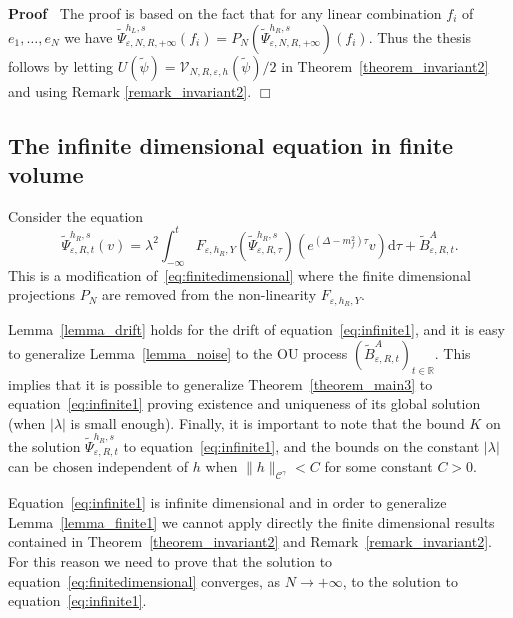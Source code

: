 \documentclass{article}
\newcommand{\mathd}{\mathrm{d}}
\newenvironment{proof}{\noindent\textbf{Proof\ }}{\hspace*{\fill}$\Box$\medskip}
\begin{document}
\begin{proof}
  The proof is based on the fact that for any linear combination $f_i$ of
  $e_1, \ldots, e_N$ we have $\tilde{\Psi}_{\varepsilon, N, R, + \infty}^{h_L,
  s} (f_i) = P_N (\tilde{\Psi}_{\varepsilon, N, R, + \infty}^{h_R, s}) (f_i)$.
  Thus the thesis follows by letting $U (\tilde{\psi}) =\mathcal{V}_{N, R,
  \varepsilon, h} (\tilde{\psi}) / 2$ in Theorem~\ref{theorem_invariant2} and
  using Remark \ref{remark_invariant2}.
\end{proof}

\subsection{The infinite dimensional equation in finite
volume}\label{sec:cont-finite-vol-yukawa}

Consider the equation
\begin{equation}
  \tilde{\Psi}_{\varepsilon, R, t}^{h_R, s} (v) = \lambda^2 \int_{- \infty}^t
  F_{\varepsilon, h_R, Y} (\tilde{\Psi}_{\varepsilon, R, \tau}^{h_R, s})
  (e^{(\Delta - m^2_f) \tau} v) \mathd \tau + \tilde{B}^A_{\varepsilon, R, t}
  \label{eq:infinite1} .
\end{equation}
This is a modification of~{\eqref{eq:finitedimensional}} where the finite
dimensional projections $P_N$ are removed from the non-linearity
$F_{\varepsilon, h_R, Y}$.

\begin{remark}
  Lemma~\ref{lemma_drift} holds for the drift of
  equation~{\eqref{eq:infinite1}}, and it is easy to generalize
  Lemma~\ref{lemma_noise} to the OU process $(\tilde{B}_{\varepsilon, R,
  t}^A)_{t \in \mathbb{R}}$. This implies that it is possible to generalize
  Theorem~\ref{theorem_main3} to equation~{\eqref{eq:infinite1}} proving
  existence and uniqueness of its global solution (when $| \lambda |$ is small
  enough). Finally, it is important to note that the bound $K$ on the solution
  $\tilde{\Psi}_{\varepsilon, R, t}^{h_R, s}$ to
  equation~{\eqref{eq:infinite1}}, and the bounds on the constant $| \lambda
  |$ can be chosen independent of $h$ when $\| h \|_{\mathcal{C}^{\gamma}} <
  C$ for some constant $C > 0$.
\end{remark}

Equation~{\eqref{eq:infinite1}} is infinite dimensional and in order to
generalize Lemma~\ref{lemma_finite1} we cannot apply directly the finite
dimensional results contained in Theorem~\ref{theorem_invariant2} and
Remark~\ref{remark_invariant2}. For this reason we need to prove that the
solution to equation~{\eqref{eq:finitedimensional}} converges, as $N
\rightarrow + \infty$, to the solution to equation~{\eqref{eq:infinite1}}.
\end{document}
